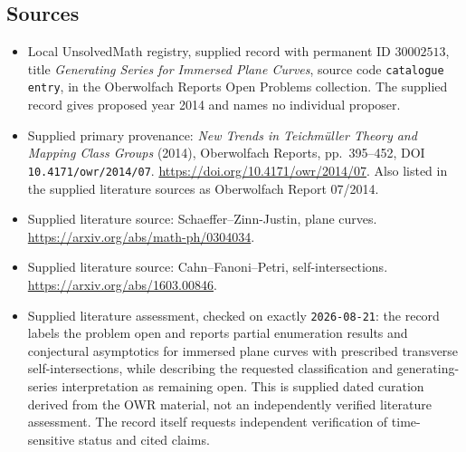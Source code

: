 \documentclass[11pt]{article}
\begin{document}
\subsection{Sources}
\begin{itemize}
\item Local UnsolvedMath registry, supplied record with permanent ID \(30002513\), title \emph{Generating Series for Immersed Plane Curves}, source code \texttt{catalogue entry}, in the Oberwolfach Reports Open Problems collection. The supplied record gives proposed year 2014 and names no individual proposer.
\item Supplied primary provenance: \emph{New Trends in Teichm\"uller Theory and Mapping Class Groups} (2014), Oberwolfach Reports, pp.~395--452, DOI \texttt{10.4171/owr/2014/07}. \url{https://doi.org/10.4171/owr/2014/07}. Also listed in the supplied literature sources as Oberwolfach Report 07/2014.
\item Supplied literature source: Schaeffer--Zinn-Justin, plane curves. \url{https://arxiv.org/abs/math-ph/0304034}.
\item Supplied literature source: Cahn--Fanoni--Petri, self-intersections. \url{https://arxiv.org/abs/1603.00846}.
\item Supplied literature assessment, checked on exactly \texttt{2026-08-21}: the record labels the problem open and reports partial enumeration results and conjectural asymptotics for immersed plane curves with prescribed transverse self-intersections, while describing the requested classification and generating-series interpretation as remaining open. This is supplied dated curation derived from the OWR material, not an independently verified literature assessment. The record itself requests independent verification of time-sensitive status and cited claims.
\end{itemize}
\end{document}
